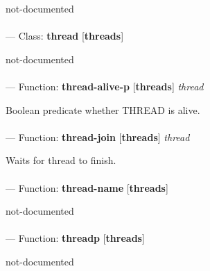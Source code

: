 \begin{adjustwidth}{5em}{5em}
not-documented
\end{adjustwidth}

\paragraph{}
\label{THREADS:THREAD}
--- Class: \textbf{thread} [\textbf{threads}] \textit{}

\begin{adjustwidth}{5em}{5em}
not-documented
\end{adjustwidth}

\paragraph{}
\label{THREADS:THREAD-ALIVE-P}
--- Function: \textbf{thread-alive-p} [\textbf{threads}] \textit{thread}

\begin{adjustwidth}{5em}{5em}
Boolean predicate whether THREAD is alive.
\end{adjustwidth}

\paragraph{}
\label{THREADS:THREAD-JOIN}
--- Function: \textbf{thread-join} [\textbf{threads}] \textit{thread}

\begin{adjustwidth}{5em}{5em}
Waits for thread to finish.
\end{adjustwidth}

\paragraph{}
\label{THREADS:THREAD-NAME}
--- Function: \textbf{thread-name} [\textbf{threads}] \textit{}

\begin{adjustwidth}{5em}{5em}
not-documented
\end{adjustwidth}

\paragraph{}
\label{THREADS:THREADP}
--- Function: \textbf{threadp} [\textbf{threads}] \textit{}

\begin{adjustwidth}{5em}{5em}
not-documented
\end{adjustwidth}

